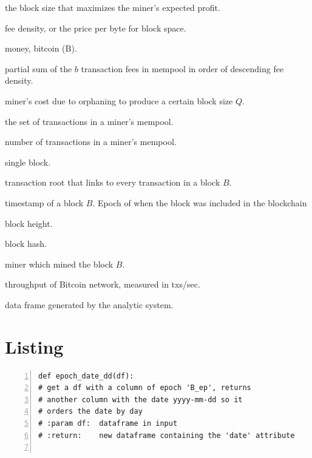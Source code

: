\documentclass[USenglish]{uit-thesis}
\def\bitcoin{\leavevmode\rlap{\hskip.5pt-}B}
\begin{document}
\begin{appendices}
\begin{description}[leftmargin=!, labelwidth=\widthof{\bfseries $M_{demand}(b)$ }]
	\item [$Q^*$] the block size that maximizes the miner’s expected profit.
	\item [$\rho$] fee density, or the price per byte for block space.
	\item [$M$] money, bitcoin (\bitcoin).
	\item [$M_{demand}(b)$] partial sum of the $b$ transaction fees
	in mempool in order of descending fee density.
	\item [$M_{supply}(Q)$] miner’s cost due to orphaning to produce a certain block size $Q$.
	\item [$\mathcal{N}$] the set of transactions in a miner’s mempool.
	\item [$n$] number of transactions in a miner’s mempool.
	\item [$B$] single block.
	\item [$B_t$] transaction root that links to every transaction in a block $B$.
	\item [$B_{epoch}$] timestamp of a block $B$.
	Epoch of when the block was included in the blockchain
	\item [$B_h$] block height.
	\item [$B_{ha}$] block hash.
	\item [$B_{mi}$] miner which mined the block $B$.
	\item [$\gamma$] throughput of Bitcoin network, measured in txs/sec.
	\item [$\delta$] data frame generated by the analytic system.
\end{description}

	\chapter{Listing}
	\label{app:listing}
	
	\begin{lstlisting}[numbers=left,frame=single,caption={Function for data manipulation. It creates a new column ('date'), from another ('B\_ep') containing the respective $B_{epoch}$ transformed in date time value with days as granularity.}]
def epoch_date_dd(df):
# get a df with a column of epoch 'B_ep', returns
# another column with the date yyyy-mm-dd so it
# orders the date by day
# :param df:  dataframe in input
# :return:    new dataframe containing the 'date' attribute


\end{lstlisting}
\end{appendices}
\end{document}
